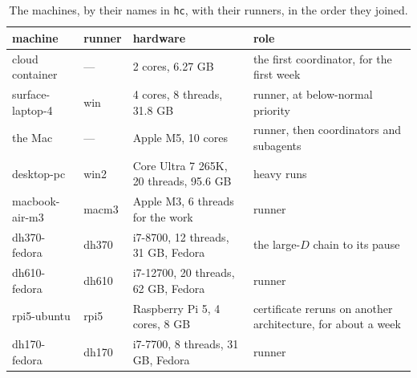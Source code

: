 \documentclass[aps,prd,onecolumn,superscriptaddress,nofootinbib,10pt]{revtex4-2}
\newcommand{\file}[1]{\texttt{#1}}
\begin{document}
\begin{table}[h]
\caption{The machines, by their names in \file{hc}, with their runners, in the order they joined.}
\label{tab:machines}
\small
\begin{tabular}{L{2.8cm}L{1.6cm}L{5.4cm}L{5.9cm}}
\toprule
machine & runner & hardware & role\\
\midrule
cloud container & --- & 2 cores, 6.27 GB & the first coordinator, for the first week\\
surface-laptop-4 & win & 4 cores, 8 threads, 31.8 GB & runner, at below-normal priority\\
the Mac & --- & Apple M5, 10 cores & runner, then coordinators and subagents\\
desktop-pc & win2 & Core Ultra 7 265K, 20 threads, 95.6 GB & heavy runs\\
macbook-air-m3 & macm3 & Apple M3, 6 threads for the work & runner\\
dh370-fedora & dh370 & i7-8700, 12 threads, 31 GB, Fedora & the large-$D$ chain to its pause\\
dh610-fedora & dh610 & i7-12700, 20 threads, 62 GB, Fedora & runner\\
rpi5-ubuntu & rpi5 & Raspberry Pi 5, 4 cores, 8 GB & certificate reruns on another architecture, for about a week\\
dh170-fedora & dh170 & i7-7700, 8 threads, 31 GB, Fedora & runner\\
\bottomrule
\end{tabular}
\end{table}
\end{document}
